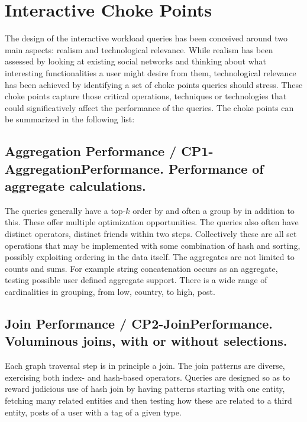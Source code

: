 \section{Interactive Choke Points}

The design of the interactive workload queries has been conceived around two
main aspects: realism and technological relevance.  While realism has been
assessed by looking at existing social networks and thinking about what
interesting functionalities a user might desire from them, technological
relevance has been achieved by identifying a set of choke points queries should
stress.  These choke points capture those critical operations, techniques or
technologies that  could significatively affect the performance of the queries.
The choke points can be summarized in the following list:


\subsection*{Aggregation Performance / CP1-AggregationPerformance. Performance of aggregate calculations.}

The queries generally have a top-$k$ order by and often a group by in
addition to this.  These offer multiple optimization opportunities.
The queries also often have distinct operators, \ie distinct friends
within two steps.  Collectively these are all set operations that may
be implemented with some combination of hash and sorting, possibly
exploiting ordering in the data itself.  The aggregates are not
limited to counts and sums.  For example string concatenation occurs
as an aggregate, testing possible user defined aggregate support.
There is a wide range of cardinalities in grouping, from low, \eg country, to high, \eg post.

\subsection*{Join Performance / CP2-JoinPerformance. Voluminous joins, with or without selections.}

Each graph traversal step is in principle a join.  The join patterns are
diverse, exercising both index- and hash-based operators.   Queries are designed
so as to reward judicious use of hash join by having patterns starting with one
entity, fetching many related entities and then testing how these are related
to a third entity, \eg posts of a user with a tag of a given type.

